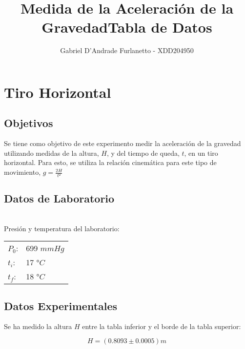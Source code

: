 \documentclass[a4paper,12pt]{article}
\begin{document}
\title{Medida de la Aceleración de la Gravedad}

\author{Gabriel D'Andrade Furlanetto - XDD204950}
\date{}
\maketitle
\pagebreak
\section{Tiro Horizontal}
\subsection{Objetivos}
Se tiene como objetivo de este experimento medir la aceleración de la gravedad utilizando medidas
de la altura, $H$, y del tiempo de queda, $t$, en un tiro horizontal. Para esto, se utiliza la
relación cinemática para este tipo de movimiento, $g =\frac{2H}{t²}$
\subsection{Datos de Laboratorio}
\begin{table}[h!]
\centering
\title{\textbf{Tabla de Datos}}
\\Presión y temperatura del laboratorio:


\begin{tabular}{|ll|}
\hline
$P_0$: & 699 $mmHg$ \\
$t_i$: & 17 °$C$ \\
$t_f$: & 18 °$C$ \\
\hline
\end{tabular}
\end{table}

\subsection{Datos Experimentales}
Se ha medido la altura $H$ entre la tabla inferior y el borde de la tabla superior:

\begin{tcolorbox}
\begin{equation}
  H = (0.8093 \pm 0.0005)m
\end{equation}
\end{tcolorbox}
\end{document}
